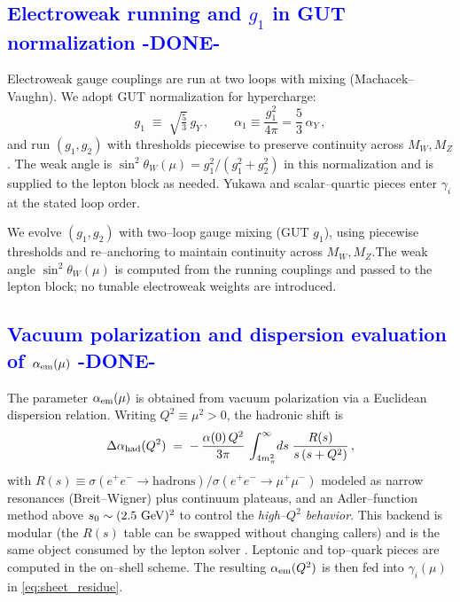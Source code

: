 \documentclass[%
 amsmath,amssymb,
 aps,
prb,
floatfix, showkeys
]{revtex4-2}
\newcommand{\modif}[1]{\textcolor{blue}{#1}}
\begin{document}
{\modif{
\subsection{Electroweak running and $g_1$ in GUT normalization -DONE-}   %
\label{subsec:ew_running}
}}
Electroweak gauge couplings are run at two loops with mixing (Machacek–Vaughn). We adopt GUT normalization for hypercharge:
\[
  g_1 \;\equiv\; \sqrt{\tfrac{5}{3}}\,g_Y\,,\qquad \alpha_1 \equiv \frac{g_1^2}{4\pi}=\frac{5}{3}\,\alpha_Y\,,
\]
and run $(g_1,g_2)$ with thresholds piecewise to preserve continuity across $M_W,M_Z$. The weak angle is $\sin^2\theta_W(\mu) = g_1^2/(g_1^2+g_2^2)$ in this normalization and is supplied to the lepton block as needed. Yukawa and scalar–quartic pieces enter $\gamma_i$ at the stated loop order.


 We evolve $(g_1,g_2)$ with two--loop gauge mixing (GUT $g_1$), using piecewise thresholds and re--anchoring to maintain continuity across $M_W,M_Z$.\;The weak angle $\sin^2\theta_W(\mu)$ is computed from the running couplings and passed to the lepton block; no tunable electroweak weights are introduced.






{\modif{
\subsection{Vacuum polarization and dispersion evaluation of $\alpha_{\rm em}(\mu)$  -DONE-}  %
\label{subsec:dispersion_alphaem}
}}
The parameter $\alpha_{\rm em}(\mu)$ is obtained from vacuum polarization via a Euclidean dispersion
relation. Writing $Q^2\equiv\mu^2>0$, the hadronic shift is
\begin{equation}
  \Delta\alpha_{\rm had}(Q^2) \;=\; -\,\frac{\alpha(0)\,Q^2}{3\pi}\,\int_{4m_\pi^2}^{\infty}\! ds\;\frac{R(s)}{s\,(s+Q^2)}\,,
  \label{eq:delta_alpha_had}
\end{equation}
with $R(s)\equiv \sigma(e^+e^-\!\to\!\text{hadrons})/\sigma(e^+e^-\!\to\!\mu^+\mu^-)$ modeled as narrow resonances (Breit–Wigner) plus continuum plateaus, and an Adler–function method above $s_0\sim(2.5~{\rm GeV})^2$ to control the \emph{high–$Q^2$ behavior}.
This backend is modular (the $R(s)$ table can be swapped without changing callers) and is the same object consumed by the lepton solver \cite{EidelmanJegerlehner1995,Jegerlehner2003,Keshavarzi2019,Davier2017}.
Leptonic and top–quark pieces are computed in the on–shell scheme. The resulting $\alpha_{\rm em}(Q^2)$ is then fed into $\gamma_i(\mu)$ in \eqref{eq:sheet_residue}.
\end{document}
